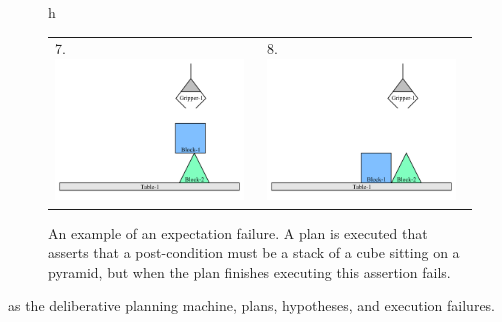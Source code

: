 \begin{figure}{h}
\begin{tabular}{p{5cm}p{5cm}}
    7. \includegraphics[width=5cm]{gfx/blocks_world_example-7}  & 8. \includegraphics[width=5cm]{gfx/blocks_world_example-8}
  \end{tabular}
  \caption[An example of an expectation failure.]{An example of an
    expectation failure.  A plan is executed that asserts that a
    post-condition must be a stack of a cube sitting on a pyramid,
    but when the plan finishes executing this assertion fails.}
  \label{figure:failure_to_stack_cube_on_pyramid}
\end{figure}
as the deliberative planning machine, plans, hypotheses, and execution
failures.

